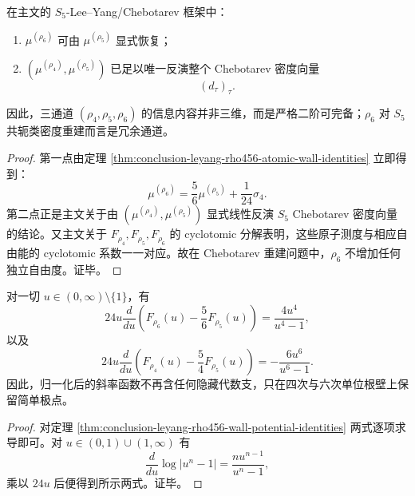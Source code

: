 \begin{theorem}\label{thm:conclusion-leyang-rho456-two-channel-completeness}
在主文的 \(S_5\)-Lee--Yang/Chebotarev 框架中：
\begin{enumerate}
  \item \(\mu^{(\rho_6)}\) 可由 \(\mu^{(\rho_5)}\) 显式恢复；
  \item \((\mu^{(\rho_4)},\mu^{(\rho_5)})\) 已足以唯一反演整个 Chebotarev 密度向量
  \[
  (d_\tau)_\tau.
  \]
\end{enumerate}
因此，三通道 \((\rho_4,\rho_5,\rho_6)\) 的信息内容并非三维，而是严格二阶可完备；\(\rho_6\) 对 \(S_5\) 共轭类密度重建而言是冗余通道。
\end{theorem}
\begin{proof}
第一点由定理 \ref{thm:conclusion-leyang-rho456-atomic-wall-identities} 立即得到：
\[
\mu^{(\rho_6)}=\frac56\mu^{(\rho_5)}+\frac1{24}\sigma_4.
\]
第二点正是主文关于由 \((\mu^{(\rho_4)},\mu^{(\rho_5)})\) 显式线性反演 \(S_5\) Chebotarev 密度向量的结论。又主文关于 \(F_{\rho_4},F_{\rho_5},F_{\rho_6}\) 的 cyclotomic 分解表明，这些原子测度与相应自由能的 cyclotomic 系数一一对应。故在 Chebotarev 重建问题中，\(\rho_6\) 不增加任何独立自由度。证毕。
\end{proof}

\begin{corollary}\label{cor:conclusion-leyang-rho456-log-derivative-rationalization}
对一切 \(u\in(0,\infty)\setminus\{1\}\)，有
\[
24u\frac{d}{du}\!\left(F_{\rho_6}(u)-\frac56F_{\rho_5}(u)\right)
=
\frac{4u^4}{u^4-1},
\]
以及
\[
24u\frac{d}{du}\!\left(F_{\rho_4}(u)-\frac54F_{\rho_5}(u)\right)
=
-\frac{6u^6}{u^6-1}.
\]
因此，归一化后的斜率函数不再含任何隐藏代数支，只在四次与六次单位根壁上保留简单极点。
\end{corollary}
\begin{proof}
对定理 \ref{thm:conclusion-leyang-rho456-wall-potential-identities} 两式逐项求导即可。对 \(u\in (0,1)\cup(1,\infty)\) 有
\[
\frac{d}{du}\log|u^n-1|=\frac{nu^{n-1}}{u^n-1},
\]
乘以 \(24u\) 后便得到所示两式。证毕。
\end{proof}

